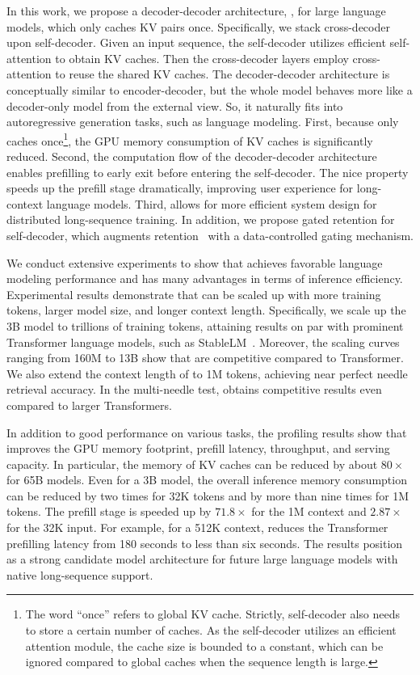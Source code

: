 In this work, we propose a decoder-decoder architecture, \our{}, for large language models, which only caches KV pairs once.
Specifically, we stack cross-decoder upon self-decoder.
Given an input sequence, the self-decoder utilizes efficient self-attention to obtain KV caches.
Then the cross-decoder layers employ cross-attention to reuse the shared KV caches.
The decoder-decoder architecture is conceptually similar to encoder-decoder, but the whole model behaves more like a decoder-only model from the external view.
So, it naturally fits into autoregressive generation tasks, such as language modeling.
First, because \our{} only caches once\footnote{The word ``once'' refers to global KV cache. Strictly, self-decoder also needs to store a certain number of caches. As the self-decoder utilizes an efficient attention module, the cache size is bounded to a constant, which can be ignored compared to global caches when the sequence length is large.}, the GPU memory consumption of KV caches is significantly reduced.
Second, the computation flow of the decoder-decoder architecture enables prefilling to early exit before entering the self-decoder.
The nice property speeds up the prefill stage dramatically, improving user experience for long-context language models.
Third, \our{} allows for more efficient system design for distributed long-sequence training.
In addition, we propose gated retention for self-decoder, which augments retention~\cite{retnet} with a data-controlled gating mechanism.

We conduct extensive experiments to show that \our{} achieves favorable language modeling performance and has many advantages in terms of inference efficiency.
Experimental results demonstrate that \our{} can be scaled up with more training tokens, larger model size, and longer context length.
Specifically, we scale up the 3B \our{} model to trillions of training tokens, attaining results on par with prominent Transformer language models, such as StableLM~\cite{stablelm}.
Moreover, the scaling curves ranging from 160M to 13B show that \our{} are competitive compared to Transformer.
We also extend the context length of \our{} to 1M tokens, achieving near perfect needle retrieval accuracy.
In the multi-needle test, \our{} obtains competitive results even compared to larger Transformers.

In addition to good performance on various tasks, the profiling results show that \our{} improves the GPU memory footprint, prefill latency, throughput, and serving capacity.
In particular, the memory of KV caches can be reduced by about $80\times$ for 65B models.
Even for a 3B model, the overall inference memory consumption can be reduced by two times for 32K tokens and by more than nine times for 1M tokens.
The prefill stage is speeded up by $71.8\times$ for the 1M context and $2.87\times$ for the 32K input.
For example, for a 512K context, \our{} reduces the Transformer prefilling latency from 180 seconds to less than six seconds.
The results position \our{} as a strong candidate model architecture for future large language models with native long-sequence support.

